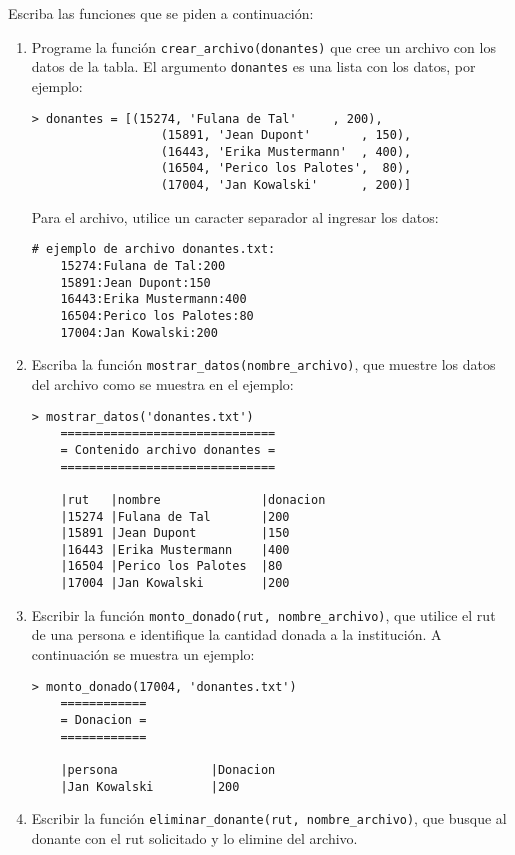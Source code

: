   Escriba las funciones que se piden a continuación:
  \begin{enumerate}
  \item
    Programe la función 
    \texttt{crear\_archivo(donantes)}
    que cree un archivo con los datos de la tabla.
    El argumento \texttt{donantes} es una lista
    con los datos,
    por ejemplo:
    
    \begin{lstlisting}[style=consola]
    > donantes = [(15274, 'Fulana de Tal'     , 200),
                  (15891, 'Jean Dupont'       , 150),
                  (16443, 'Erika Mustermann'  , 400),
                  (16504, 'Perico los Palotes',  80),
                  (17004, 'Jan Kowalski'      , 200)] 
    \end{lstlisting}
    Para el archivo,
    utilice un caracter separador al ingresar los datos:
    
    \begin{lstlisting}[style=consola]
    # ejemplo de archivo donantes.txt:
    15274:Fulana de Tal:200
    15891:Jean Dupont:150
    16443:Erika Mustermann:400
    16504:Perico los Palotes:80
    17004:Jan Kowalski:200
    \end{lstlisting}
  \item
    Escriba la función
    \texttt{mostrar\_datos(nombre\_archivo)},
    que muestre los datos del archivo
    como se muestra en el ejemplo:
    
    \begin{lstlisting}[style=consola]
    > mostrar_datos('donantes.txt')
    ==============================
    = Contenido archivo donantes = 
    ==============================

    |rut   |nombre              |donacion
    |15274 |Fulana de Tal       |200
    |15891 |Jean Dupont         |150
    |16443 |Erika Mustermann    |400
    |16504 |Perico los Palotes  |80
    |17004 |Jan Kowalski        |200
    \end{lstlisting}
  \pagebreak[4]
  \item
    Escribir la función
    \texttt{monto\_donado(rut, nombre\_archivo)},
    que utilice el rut de una persona e identifique
    la cantidad donada a la institución.
    A continuación se muestra un ejemplo:
    
    \begin{lstlisting}[style=consola]
    > monto_donado(17004, 'donantes.txt')
    ============
    = Donacion =
    ============

    |persona             |Donacion
    |Jan Kowalski        |200
    \end{lstlisting}
  \item
    Escribir la función
    \texttt{eliminar\_donante(rut, nombre\_archivo)},
    que busque al donante con el rut solicitado 
    y lo elimine del archivo.
    

\end{enumerate}
